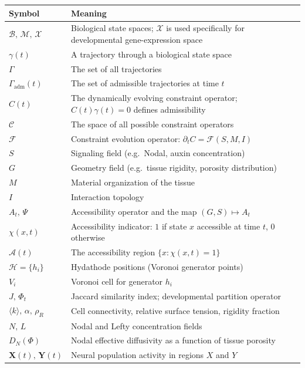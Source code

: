 \documentclass[12pt, a4paper, openany]{book}
\theoremstyle{definition}
\theoremstyle{remark}
\begin{document}
\noindent
\begin{tabular}{@{}lp{10.5cm}@{}}
\toprule
\textbf{Symbol} & \textbf{Meaning} \\
\midrule
$\mathcal{B},\,\mathcal{M},\,\mathcal{X}$ & Biological state spaces; $\mathcal{X}$ is used specifically for developmental gene-expression space \\[4pt]
$\gamma(t)$ & A trajectory through a biological state space \\[4pt]
$\Gamma$ & The set of all trajectories \\[4pt]
$\Gamma_{\mathrm{adm}}(t)$ & The set of admissible trajectories at time $t$ \\[4pt]
$C(t)$ & The dynamically evolving constraint operator; $C(t)\gamma(t)=0$ defines admissibility \\[4pt]
$\mathcal{C}$ & The space of all possible constraint operators \\[4pt]
$\mathcal{F}$ & Constraint evolution operator: $\partial_t C = \mathcal{F}(S,M,I)$ \\[4pt]
$S$ & Signaling field (e.g.\ Nodal, auxin concentration) \\[4pt]
$G$ & Geometry field (e.g.\ tissue rigidity, porosity distribution) \\[4pt]
$M$ & Material organization of the tissue \\[4pt]
$I$ & Interaction topology \\[4pt]
$A_t,\,\Psi$ & Accessibility operator and the map $(G,S)\mapsto A_t$ \\[4pt]
$\chi(x,t)$ & Accessibility indicator: $1$ if state $x$ accessible at time $t$, $0$ otherwise \\[4pt]
$\mathcal{A}(t)$ & The accessibility region $\{x:\chi(x,t)=1\}$ \\[4pt]
$\mathcal{H}=\{h_i\}$ & Hydathode positions (Voronoi generator points) \\[4pt]
$V_i$ & Voronoi cell for generator $h_i$ \\[4pt]
$J,\,\Phi_t$ & Jaccard similarity index; developmental partition operator \\[4pt]
$\langle k\rangle,\,\alpha,\,\rho_R$ & Cell connectivity, relative surface tension, rigidity fraction \\[4pt]
$N,\,L$ & Nodal and Lefty concentration fields \\[4pt]
$D_N(\Phi)$ & Nodal effective diffusivity as a function of tissue porosity \\[4pt]
$\mathbf{X}(t),\,\mathbf{Y}(t)$ & Neural population activity in regions $X$ and $Y$ \\[4pt]

\end{tabular}
\end{document}
